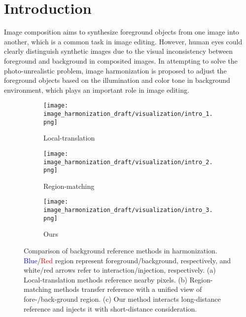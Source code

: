 \documentclass[10pt,twocolumn,letterpaper]{article}
\begin{document}
\section{Introduction}

\label{sec:intro}
Image composition aims to synthesize foreground objects from one image into another, which is a common task in image editing. However, human eyes could clearly distinguish synthetic images due to the visual inconsistency between foreground and background in composited images.
In attempting to solve the photo-unrealistic problem, image harmonization is proposed to adjust the foreground objects based on the illumination and color tone in background environment, which plays an important role in image editing.

\begin{figure}[!t]
    \centering
    \begin{subfigure}{0.32\linewidth}
    \texttt{[image: image\_harmonization\_draft/visualization/intro\_1.png]}
    \caption{Local-translation}
    \label{fig:pixel-level}
    \end{subfigure}
    \begin{subfigure}{0.32\linewidth}
    \texttt{[image: image\_harmonization\_draft/visualization/intro\_2.png]}
    \caption{Region-matching}
    \label{fig:image-level}
    \end{subfigure}
    \begin{subfigure}{0.32\linewidth}
    \texttt{[image: image\_harmonization\_draft/visualization/intro\_3.png]}
    \caption{Ours}
    \label{fig:intro_ours}
    \end{subfigure}
    \caption{Comparison of background reference methods in harmonization. \textcolor{blue}{Blue}/\textcolor{red}{Red} region represent foreground/background, respectively, and white/red arrows refer to interaction/injection, respectively. (a) Local-translation methods reference nearby pixels. (b) Region-matching methods transfer reference with a unified view of fore-/back-ground region. (c) Our method interacts long-distance reference and injects it with short-distance consideration. 
 }
    \label{fig:intro}
    \vspace{-1em}
\end{figure}
\end{document}
